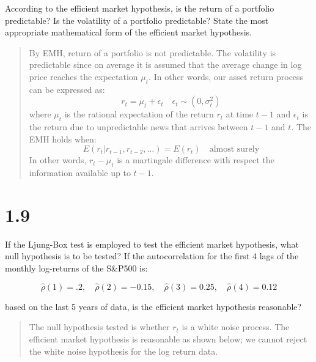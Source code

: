 \documentclass[11pt,]{article}
\begin{document}
According to the efficient market hypothesis, is the return of a
portfolio predictable? Is the volatility of a portfolio predictable?
State the most appropriate mathematical form of the efficient market
hypothesis.

\begin{quote}
By EMH, return of a portfolio is not predictable. The volatility is
predictable since on average it is assumed that the average change in
log price reaches the expectation \(\mu_t\). In other words, our asset
return process can be expressed as: \[
r_t = \mu_t + \epsilon_t \quad \epsilon_t \sim (0, \sigma_t^2)
\] where \(\mu_t\) is the rational expectation of the return \(r_t\) at
time \(t-1\) and \(\epsilon_t\) is the return due to unpredictable news
that arrives between \(t-1\) and \(t\). The EMH holds when: \[
E(r_t | r_{t-1}, r_{t-2}, \ldots) = E(r_t) \quad \text{almost surely}
\] In other words, \(r_t - \mu_t\) is a martingale difference with
respect the information available up to \(t-1\).
\end{quote}

\hypertarget{section-3}{%
\section{1.9}\label{section-3}}

If the Ljung-Box test is employed to test the efficient market
hypothesis, what null hypothesis is to be tested? If the autocorrelation
for the first 4 lags of the monthly log-returns of the S\&P500 is:

\[
\hat{\rho}(1) = .2, \quad \hat{\rho}(2) = -0.15, \quad \hat{\rho}(3) = 0.25, \quad \hat{\rho}(4) = 0.12
\]

based on the last 5 years of data, is the efficient market hypothesis
reasonable?

\begin{quote}
The null hypothesis tested is whether \(r_t\) is a white noise process.
The efficient market hypothesis is reasonable as shown below; we cannot
reject the white noise hypothesis for the log return data.
\end{quote}
\end{document}
